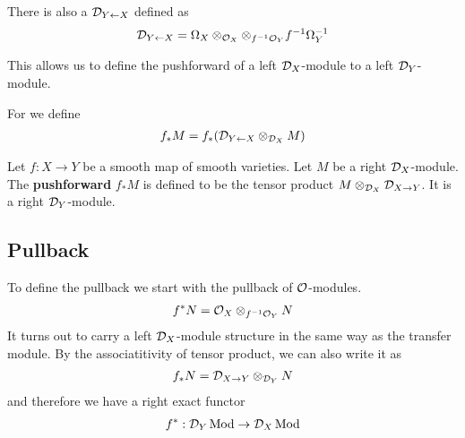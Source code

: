 \begin{definition}
	There is also a  ${\mathcal{D}}_{Y \leftarrow X}$ defined as \begin{align*}
		{\mathcal{D}}_{Y\leftarrow X} = \Omega_X\otimes_{{\mathcal{O}}_X} \otimes_{f^{-1}{\mathcal{O}}_Y} {f}^{-1}\Omega_Y^{-1}
	\end{align*}
\end{definition}
This allows us to define the pushforward of a left ${\mathcal{D}}_X$-module to a left ${\mathcal{D}}_Y$-module.
\begin{definition}
	For we define \begin{align*}
		f_*M = f_*({\mathcal{D}}_{Y\leftarrow X}\otimes_{{\mathcal{D}}_X} M)
	\end{align*}
\end{definition}


\begin{definition}
	Let $f:X\to Y$ be a smooth map of smooth varieties.
	Let $M$ be a right ${\mathcal{D}}_X$-module. The \textbf{pushforward} $f_*M$ is defined to be the tensor product
	$M\otimes_{{\mathcal{D}}_X} {\mathcal{D}}_{X\to Y}$. It is a right ${\mathcal{D}}_Y$-module.
\end{definition}

\subsection{Pullback}

\begin{definition}
	To define the pullback we start with the pullback of ${\mathcal{O}}$-modules. \begin{align*}
		f^*N = {\mathcal{O}}_X\otimes_{f^{-1}{\mathcal{O}}_Y} N
	\end{align*} It turns out to carry a left ${\mathcal{D}}_X$-module structure in the same way as the transfer module.
	By the associatitivity of tensor product,
	we can also write it as \begin{align*}
		f_*N = {\mathcal{D}}_{X\to Y}\otimes_{{\mathcal{D}}_Y} N
	\end{align*} and therefore we have a right exact functor \begin{align*}
		f^*:{\mathcal{D}}_Y\operatorname{Mod} \to {\mathcal{D}}_X\operatorname{Mod}
	\end{align*}
\end{definition}

